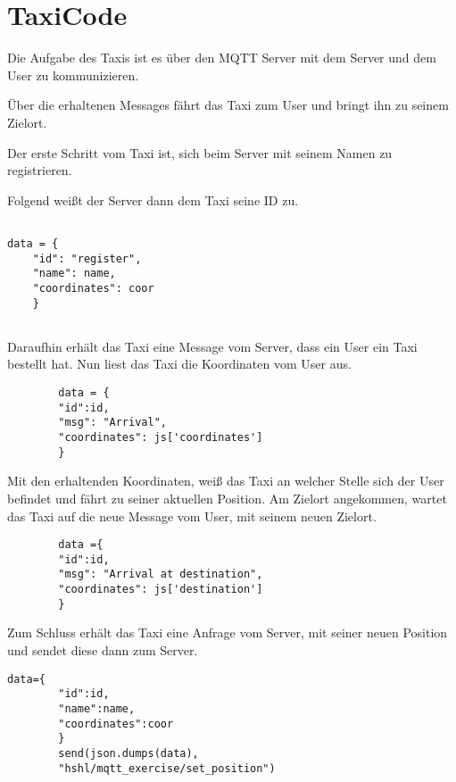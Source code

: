 \section{TaxiCode}

Die Aufgabe des Taxis ist es über den MQTT Server mit dem Server und dem User zu kommunizieren.
 
Über die erhaltenen Messages fährt das Taxi zum User und bringt ihn zu seinem Zielort.

Der erste Schritt vom Taxi ist, sich beim Server mit seinem Namen zu registrieren. 

Folgend weißt der Server dann dem Taxi seine ID zu.

\begin{lstlisting} 

data = {
	"id": "register", 
	"name": name,
	"coordinates": coor
    }
    
\end{lstlisting}



Daraufhin erhält das Taxi eine Message vom Server, dass ein User ein Taxi bestellt hat. 
Nun liest das Taxi die Koordinaten vom User aus. 

\begin{lstlisting} 
        data = {
        "id":id,
        "msg": "Arrival",
        "coordinates": js['coordinates']
        }
\end{lstlisting}



Mit den erhaltenden Koordinaten, weiß das Taxi an welcher Stelle sich der User befindet und fährt zu seiner aktuellen Position.
Am Zielort angekommen, wartet das Taxi auf die neue Message vom User, mit seinem neuen Zielort.


\begin{lstlisting} 
        data ={
        "id":id,
        "msg": "Arrival at destination",
        "coordinates": js['destination']
        }
\end{lstlisting}



Zum Schluss erhält das Taxi eine Anfrage vom Server, mit seiner neuen Position und sendet diese dann zum Server.

\begin{lstlisting} 
data={
        "id":id,
        "name":name,
        "coordinates":coor
        }
        send(json.dumps(data),
        "hshl/mqtt_exercise/set_position")

\end{lstlisting}
